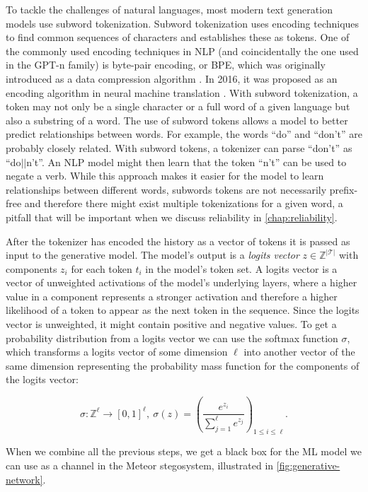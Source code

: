 To tackle the challenges of natural languages, most modern text generation models use subword tokenization.
Subword tokenization uses encoding techniques to find common sequences of characters and establishes these as tokens.
One of the commonly used encoding techniques in NLP (and coincidentally the one used in the GPT-n family) is byte-pair encoding, or BPE, which was originally introduced as a data compression algorithm \cite{BPE1994}.
In 2016, it was proposed as an encoding algorithm in neural machine translation \cite{BPENMT2016}.
With subword tokenization, a token may not only be a single character or a full word of a given language but also a substring of a word.
The use of subword tokens allows a model to better predict relationships between words.
For example, the words ``do'' and ``don't'' are probably closely related.
With subword tokens, a tokenizer can parse ``don't'' as ``do$||$n't''. 
An NLP model might then learn that the token ``n't'' can be used to negate a verb.
While this approach makes it easier for the model to learn relationships between different words, subwords tokens are not necessarily prefix-free and therefore there might exist multiple tokenizations for a given word, a pitfall that will be important when we discuss reliability in \autoref{chap:reliability}.

After the tokenizer has encoded the history as a vector of tokens it is passed as input to the generative model.
The model's output is a \emph{logits vector} $z \in \mathbb{Z}^{|\mathcal{T}|}$ with components $z_i$ for each token $t_i$ in the model's token set.
A logits vector is a vector of unweighted activations of the model's underlying layers, where a higher value in a component represents a stronger activation and therefore a higher likelihood of a token to appear as the next token in the sequence.
Since the logits vector is unweighted, it might contain positive and negative values.
To get a probability distribution from a logits vector we can use the softmax function $\sigma$, which transforms a logits vector of some dimension $\ell$ into another vector of the same dimension representing the probability mass function for the components of the logits vector:

$$\sigma \colon \mathbb{Z}^{\ell} \rightarrow [0,1]^{\ell},~ \sigma(z) = \left(\frac{e^{z_i}}{\sum_{j=1}^{\ell} e^{z_j}}\right)_{1 \leq i \leq \ell}.$$

When we combine all the previous steps, we get a black box for the ML model we can use as a channel in the Meteor stegosystem, illustrated in \autoref{fig:generative-network}.

